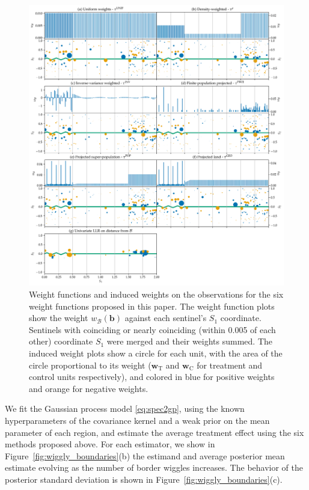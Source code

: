 \documentclass[letter]{article}
\makeatletter
\def\maxwidth{\ifdim\Gin@nat@width>\linewidth\linewidth
\else\Gin@nat@width\fi}
\let\Oldincludegraphics\includegraphics
\renewcommand{\includegraphics}[1]{\Oldincludegraphics[width=0.9\maxwidth]{#1}}
\newcommand{\treat}{\mathrm{T}}
\newcommand{\ctrol}{\mathrm{C}}
\newcommand{\wvec}{\mathbold{w}}
\newcommand{\border}{\mathcal{B}}
\newcommand{\sentinel}{\bm{b}}
\newcommand{\weightb}{w_{\border}}
\newcommand{\wt}{\wvec_{\treat}}
\newcommand{\wc}{\wvec_{\ctrol}}
\makeatother
\begin{document}
    	\begin{figure}
\centering
\includegraphics{../figures/weight_functions.png}
\caption{\label{fig:weight_functions}Weight functions and induced weights on the observations for the six weight functions proposed in this paper. The weight function plots show the weight \(\weightb(\sentinel)\) against each sentinel's \(S_1\) coordinate. Sentinels with coinciding or nearly coinciding (within 0.005 of each other) coordinate \(S_1\) were merged and their weights summed. The induced weight plots show a circle for each unit, with the area of the circle proportional to its weight (\(\wt\) and \(\wc\) for treatment and control units respectively), and colored in blue for positive weights and orange for negative weights.}
\end{figure}
    


    	We fit the Gaussian process model \eqref{eq:spec2gp},
using the known hyperparameters of the covariance kernel and a weak prior on the mean parameter of each region,
and estimate the average treatment effect using the six methods proposed above.
For each estimator, we show in Figure~\ref{fig:wiggly_boundaries}(b) the estimand and average posterior mean estimate evolving as the number of border wiggles increases.
The behavior of the posterior standard deviation is shown in Figure~\ref{fig:wiggly_boundaries}(c).
\end{document}
